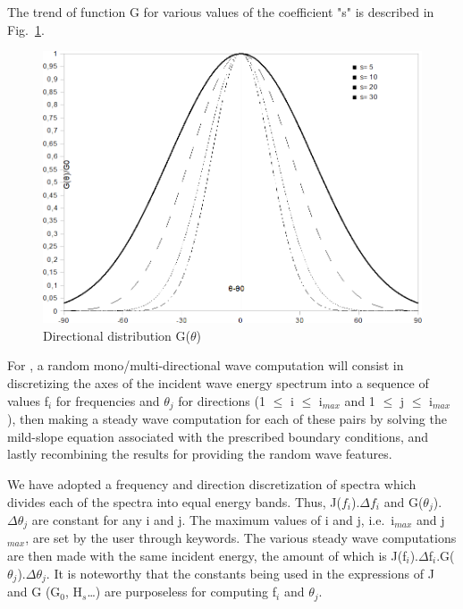 The trend of function G for various values of the coefficient "s" is described
in Fig.~\ref{fig:dir_dist}.

\begin{figure}[H]%
\begin{center}
%
  \includegraphics[width=\textwidth]{./graphics/dir_dist}
%
\caption{Directional distribution G($\theta$)}\label{fig:dir_dist}
\end{center}
\end{figure}

For \artemis{}, a random mono/multi-directional wave computation will consist
in discretizing the axes of the incident wave energy spectrum into a sequence
of values f${}_{i}$ for frequencies and $\theta_{j}$ for directions (1
$\mathrm{\le}$ i $\mathrm{\le}$ i${}_{max}$ and 1 $\mathrm{\le}$ j
$\mathrm{\le}$ i${}_{max}$), then making a steady wave computation for each of
these pairs by solving the mild-slope equation associated with the prescribed
boundary conditions, and lastly recombining the results for providing the
random wave features.

We have adopted a frequency and direction discretization of spectra which
divides each of the spectra into equal energy bands. Thus,
J($f_{i}$).$\Delta f_{i}$ and G($\theta_{j}$).$\Delta \theta_{j}$ are
constant for any i and j. The maximum values of i and j, i.e.\ i${}_{max}$ and
j${}_{max}$, are set by the user through keywords. The various steady wave
computations are then made with the same incident energy, the amount of which
is J(f${}_{i}$).$\Delta$f${}_{i}$.G($\theta_{j}$).$\Delta \theta_{j}$. It is
noteworthy that the constants being used in the expressions of J and G
(G${}_{0}$, H${}_{s}$\ldots) are purposeless for computing f${}_{i}$ and
$\theta_{j}$.

